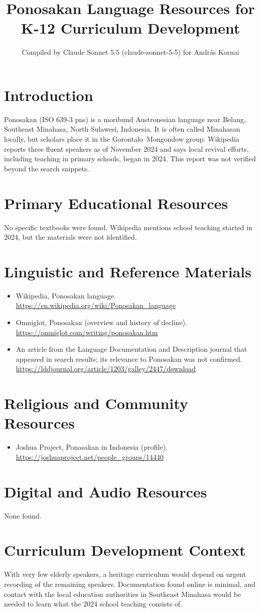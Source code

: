 \documentclass[12pt]{article}
\title{Ponosakan Language Resources for K-12 Curriculum Development}
\author{Compiled by Claude Sonnet 5.5 (claude-sonnet-5-5) for Andr\'as Kornai}
\date{}
\begin{document}
\maketitle
\section{Introduction}
Ponosakan (ISO 639-3 pns) is a moribund Austronesian language near Belang, Southeast Minahasa, North Sulawesi, Indonesia. It is often called Minahasan locally, but scholars place it in the Gorontalo--Mongondow group. Wikipedia reports three fluent speakers as of November 2024 and says local revival efforts, including teaching in primary schools, began in 2024. This report was not verified beyond the search snippets.
\section{Primary Educational Resources}
No specific textbooks were found. Wikipedia mentions school teaching started in 2024, but the materials were not identified.
\section{Linguistic and Reference Materials}
\begin{itemize}
\item Wikipedia, Ponosakan language. \url{https://en.wikipedia.org/wiki/Ponosakan_language}
\item Omniglot, Ponosakan (overview and history of decline). \url{https://omniglot.com/writing/ponosakan.htm}
\item An article from the Language Documentation and Description journal that appeared in search results; its relevance to Ponosakan was not confirmed. \url{https://lddjournal.org/article/1203/galley/2447/download}
\end{itemize}
\section{Religious and Community Resources}
\begin{itemize}
\item Joshua Project, Ponasakan in Indonesia (profile). \url{https://joshuaproject.net/people_groups/14440}
\end{itemize}
\section{Digital and Audio Resources}
None found.
\section{Curriculum Development Context}
With very few elderly speakers, a heritage curriculum would depend on urgent recording of the remaining speakers. Documentation found online is minimal, and contact with the local education authorities in Southeast Minahasa would be needed to learn what the 2024 school teaching consists of.
\end{document}
